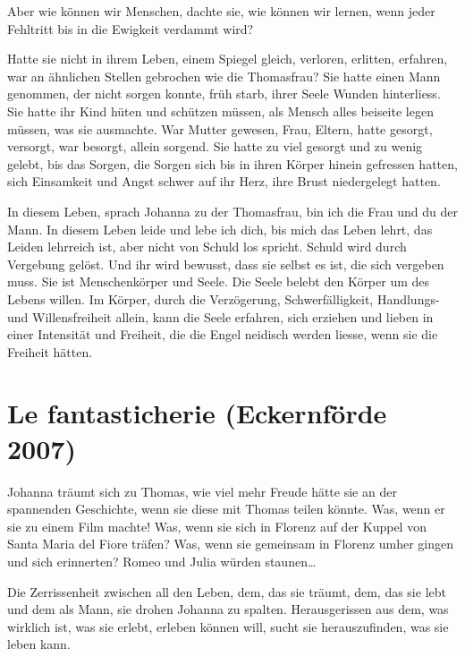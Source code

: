 \documentclass[10pt,titlepage,a5paper]{book}
\begin{document}
Aber wie können wir Menschen, dachte sie, wie können wir lernen, wenn jeder Fehltritt bis in die Ewigkeit verdammt wird?

Hatte sie nicht in ihrem Leben, einem Spiegel gleich, verloren, erlitten, erfahren, war an ähnlichen Stellen gebrochen wie die Thomasfrau?
Sie hatte einen Mann genommen, der nicht sorgen konnte, früh starb, ihrer Seele Wunden hinterliess. Sie hatte ihr Kind hüten und schützen müssen, als Mensch alles beiseite legen müssen, was sie ausmachte. War Mutter gewesen, Frau, Eltern, hatte gesorgt, versorgt, war besorgt, allein sorgend. Sie hatte zu viel gesorgt und zu wenig gelebt, bis das Sorgen, die Sorgen sich bis in ihren Körper hinein gefressen hatten, sich Einsamkeit und Angst schwer auf ihr Herz, ihre Brust niedergelegt hatten.

In diesem Leben, sprach Johanna zu der Thomasfrau, bin ich die Frau und du der Mann. In diesem Leben leide und lebe ich dich, bis mich das Leben lehrt, das Leiden lehrreich ist, aber nicht von Schuld los spricht.
Schuld wird durch Vergebung gelöst. Und ihr wird bewusst, dass sie selbst es ist, die sich vergeben muss. Sie ist Menschenkörper und Seele. Die Seele belebt den Körper um des Lebens willen. Im Körper, durch  die Verzögerung, Schwerfälligkeit, Handlungs- und Willensfreiheit allein, kann die Seele erfahren, sich erziehen und lieben in einer Intensität und Freiheit, die die Engel neidisch werden liesse, wenn sie die Freiheit hätten.



\section*{Le fantasticherie (Eckernförde 2007)}




Johanna träumt sich zu Thomas, wie viel mehr Freude hätte sie an der spannenden Geschichte, wenn sie diese mit Thomas teilen könnte.
Was, wenn er sie zu einem Film machte! Was, wenn sie sich in Florenz auf der Kuppel von Santa Maria del Fiore träfen? Was, wenn sie gemeinsam in Florenz umher gingen und sich erinnerten? Romeo und Julia würden staunen\dots 

Die Zerrissenheit zwischen all den Leben, dem, das sie träumt, dem, das sie lebt und dem als Mann, sie drohen Johanna zu spalten. Herausgerissen aus dem, was wirklich ist, was sie erlebt, erleben können will, sucht sie herauszufinden, was sie leben kann.
\end{document}
